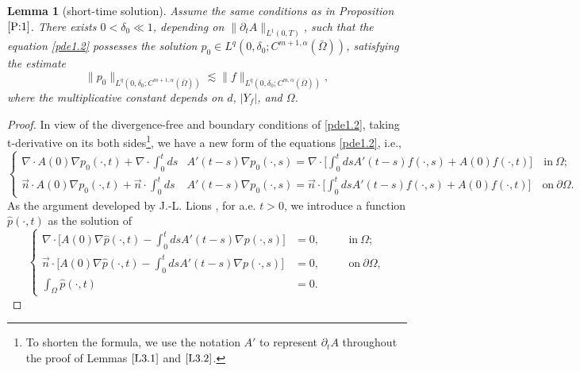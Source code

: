 \documentclass[13pt,CJK]{article}
\theoremstyle{plain}                       %
\newtheorem{lemma}{Lemma}[section]
\theoremstyle{remark}
\numberwithin{equation}{section}
\begin{document}
\begin{lemma}[short-time solution]\label{L3.1}
Assume the same conditions as in Proposition $\ref{P:1}$.
There exists $0<\delta_0\ll 1$, depending on $\|\partial_tA\|_{L^1(0,T)}$, such
that the equation \eqref{pde1.2} possesses
the solution $p_0 \in L^q(0,\delta_0;C^{m+1,\alpha}(\bar{\Omega}))$, satisfying the estimate
\begin{equation}\label{pri:3.2}
\|p_0\|_{L^q(0,\delta_0;C^{m+1,\alpha}(\bar{\Omega}))}\lesssim
\|f\|_{L^q(0,\delta_0;C^{m,\alpha}(\bar{\Omega}))},
\end{equation}
where the multiplicative constant depends on $d$, $|Y_f|$, and $\Omega$.
\end{lemma}

\begin{proof}
In view of the divergence-free and boundary conditions of \eqref{pde1.2},
taking t-derivative on its both sides\footnote{To shorten the formula,
we use the notation $A'$ to represent $\partial_t A$ throughout the proof of Lemmas $\ref{L3.1}$
and $\ref{L3.2}$.}, we have
a new form of the equations \eqref{pde1.2}, i.e.,
\begin{equation}\label{rh1}
\left\{
\begin{aligned}
  \nabla\cdot A(0)\nabla p_0(\cdot,t) +
  \nabla\cdot
  \int_{0}^tds
  &A'(t-s)
  \nabla p_0(\cdot,s)
  =
  \nabla\cdot\Big[
  \int_{0}^tdsA'(t-s)f(\cdot,s)+A(0)f(\cdot,t)
  \Big]\quad  \text{in}~\Omega;\\
 \vec{n}\cdot A(0)\nabla p_0(\cdot,t) +
  \vec{n}\cdot
  \int_{0}^tds
  &A'(t-s)\nabla p_0(\cdot,s)
  =
  \vec{n}\cdot\Big[
  \int_{0}^tdsA'(t-s)f(\cdot,s)+A(0) f(\cdot,t)
  \Big]\quad \text{on}~\partial\Omega.
\end{aligned}\right.
\end{equation}
As the argument developed by J.-L. Lions \cite[pp.170]{Lions81}, for a.e. $t>0$, we introduce a function $\hat{p}(\cdot,t)$ as the solution of
\begin{equation}\label{pde:3.1}
\left\{\begin{aligned}
\nabla\cdot\Big[A(0)\nabla\hat{p}(\cdot,t)-\int_{0}^{t}ds
A'(t-s)\nabla p(\cdot,s)
\Big]&=0,&\quad &\text{in}~\Omega;\\
\vec{n}\cdot\Big[A(0)\nabla\hat{p}(\cdot,t)-\int_{0}^{t}ds
A'(t-s)\nabla p(\cdot,s)
\Big]&=0,&\quad &\text{on}~\partial\Omega,\\
\int_{\Omega}\hat{p}(\cdot,t)&=0.
\end{aligned}\right.
\end{equation}

\end{proof}
\end{document}
